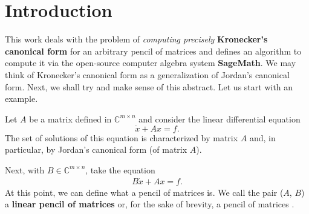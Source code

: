 \section{Introduction}
This work deals with the problem of \textit{computing precisely} \textbf{Kronecker's canonical form} for an
arbitrary pencil of matrices and defines an algorithm to compute it via the open-source computer algebra
system \textbf{SageMath}\cite{sage}. We may think of Kronecker's canonical form as a generalization of
Jordan's canonical form. Next, we shall try and make sense of this abstract. Let us start with an example.

Let $A$ be a matrix defined in $\mathbb{C}^{m \times n}$ and consider the linear differential equation
\[
	\dot{x} + Ax = f.
\]
The set of solutions of this equation is characterized by matrix $A$ and, in particular, by Jordan's canonical form
(of matrix $A$).

Next, with $B \in \mathbb{C}^{m \times n}$, take the equation
\begin{gather} \label{intro:1}
	B\dot{x} + Ax = f.
\end{gather}
At this point, we can define what a pencil of matrices is. We call the pair ($A$, $B$) a \textbf{linear pencil
of matrices} or, for the sake of brevity, a pencil of matrices \cite{ikramov}.

